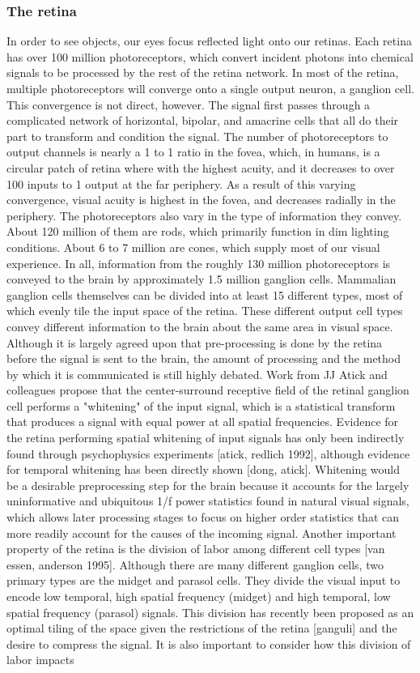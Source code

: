 \subsubsection{The retina} In order to see objects, our eyes focus reflected light onto our retinas. Each retina has over 100 million photoreceptors, which convert incident photons into chemical signals to be processed by the rest of the retina network. In most of the retina, multiple photoreceptors will converge onto a single output neuron, a ganglion cell. This convergence is not direct, however. The signal first passes through a complicated network of horizontal, bipolar, and amacrine cells that all do their part to transform and condition the signal. The number of photoreceptors to output channels is nearly a 1 to 1 ratio in the fovea, which, in humans, is a circular patch of retina where with the highest acuity, and it decreases to over 100 inputs to 1 output at the far periphery. As a result of this varying convergence, visual acuity is highest in the fovea, and decreases radially in the periphery. The photoreceptors also vary in the type of information they convey. About 120 million of them are rods, which primarily function in dim lighting conditions. About 6 to 7 million are cones, which supply most of our visual experience. In all, information from the roughly 130 million photoreceptors is conveyed to the brain by approximately 1.5 million ganglion cells. Mammalian ganglion cells themselves can be divided into at least 15 different types, most of which evenly tile the input space of the retina. These different output cell types convey different information to the brain about the same area in visual space. Although it is largely agreed upon that pre-processing is done by the retina before the signal is sent to the brain, the amount of processing and the method by which it is communicated is still highly debated. Work from JJ Atick and colleagues propose that the center-surround receptive field of the retinal ganglion cell performs a "whitening" of the input signal, which is a statistical transform that produces a signal with equal power at all spatial frequencies. Evidence for the retina performing spatial whitening of input signals has only been indirectly found through psychophysics experiments [atick, redlich 1992], although evidence for temporal whitening has been directly shown [dong, atick]. Whitening would be a desirable preprocessing step for the brain because it accounts for the largely uninformative and ubiquitous 1/f power statistics found in natural visual signals, which allows later processing stages to focus on higher order statistics that can more readily account for the causes of the incoming signal. Another important property of the retina is the division of labor among different cell types [van essen, anderson 1995]. Although there are many different ganglion cells, two primary types are the midget and parasol cells. They divide the visual input to encode low temporal, high spatial frequency (midget) and high temporal, low spatial frequency (parasol) signals. This division has recently been proposed as an optimal tiling of the space given the restrictions of the retina [ganguli] and the desire to compress the signal. It is also important to consider how this division of labor impacts 